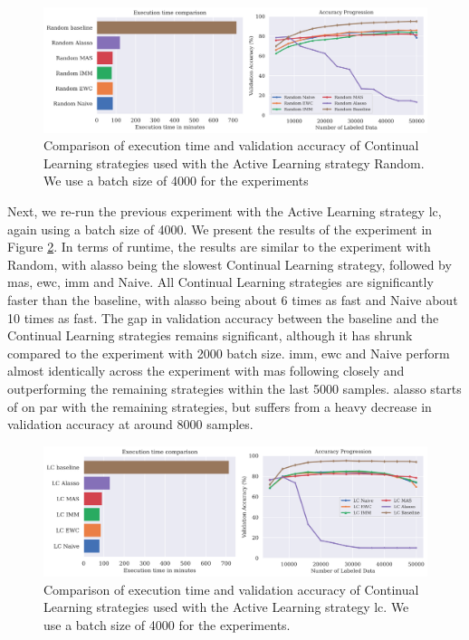 \begin{figure}[h]
    \centering
    \includegraphics[width=\linewidth]{images/results_CAL/Random_CAL_4000b.png}
    \caption[Continual Active Learning Random 4000 batch size]{Comparison of execution time and validation accuracy of Continual Learning strategies used with the Active Learning strategy
    Random. We use a batch size of 4000 for the experiments}
    \label{fig:Evaluation:Results:CAL:Random4000}
\end{figure}

Next, we re-run the previous experiment with the Active Learning strategy \gls{lc}, again using a batch size of 4000. We present the results of the experiment in Figure \ref{fig:Evaluation:Results:CAL:LC4000}. In terms of runtime,
the results are similar to the experiment with Random, with \gls{alasso} being the slowest Continual Learning strategy, followed by \gls{mas}, \gls{ewc}, \gls{imm} and Naive. All Continual Learning strategies are significantly faster than the baseline,
with \gls{alasso} being about 6 times as fast and Naive about 10 times as fast. The gap in validation accuracy between the baseline and the Continual Learning strategies remains significant, although it has shrunk compared to the
experiment with 2000 batch size. \gls{imm}, \gls{ewc} and Naive perform almost identically across the experiment with \gls{mas} following closely and outperforming the remaining strategies within the last 5000 samples. \gls{alasso} starts of on par
with the remaining strategies, but suffers from a heavy decrease in validation accuracy at around 8000 samples. \par

\begin{figure}[h]
    \centering
    \includegraphics[width=\linewidth]{images/results_CAL/LC_CAL_4000b.png}
    \caption[Continual Active Learning \gls{lc} 4000 batch size]{Comparison of execution time and validation accuracy of Continual Learning strategies used with the Active Learning strategy
    \gls{lc}. We use a batch size of 4000 for the experiments. }
    \label{fig:Evaluation:Results:CAL:LC4000}
\end{figure}

